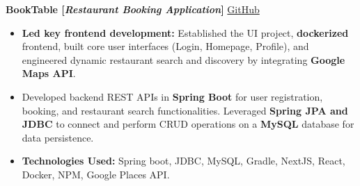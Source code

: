\documentclass[10pt, letterpaper]{article}
\newenvironment{highlights}{
    \begin{itemize}[
        topsep=0.10 cm,     %
        parsep=0.10 cm,     %
        partopsep=0pt,      %
        itemsep=0pt,        %
        leftmargin=0 cm + 10pt  %
    ]
}{
    \end{itemize}
}
\begin{document}
        \vspace{0.2 cm}

        \noindent
        \textbf{BookTable [\textit{Restaurant Booking Application}]} \hfill \href{https://github.com/gopinathsjsu/team-project-20201-synergy}{\small \faGithub \space GitHub}
        
        \begin{highlights}
            \item \textbf{Led key frontend development:} Established the UI project, \textbf{dockerized} frontend, built core user interfaces (Login, Homepage, Profile), and engineered dynamic restaurant search and discovery by integrating \textbf{Google Maps API}.
            \item Developed backend REST APIs in \textbf{Spring Boot} for user registration, booking, and restaurant search functionalities. Leveraged \textbf{Spring JPA and JDBC} to connect and perform CRUD operations on a \textbf{MySQL} database for data persistence.
            \item \textbf{Technologies Used:} Spring boot, JDBC, MySQL, Gradle, NextJS, React, Docker, NPM, Google Places API.
        \end{highlights}
\end{document}
